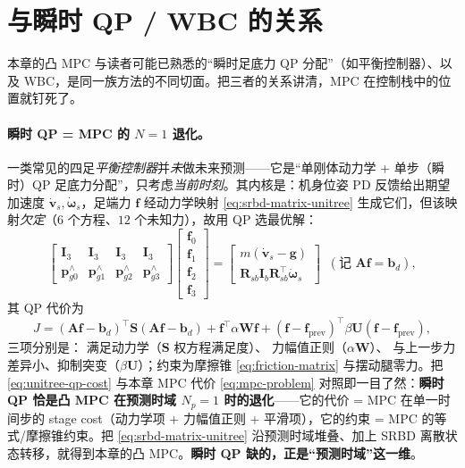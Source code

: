 \section{与瞬时 QP / WBC 的关系}
\label{sec:relation}

本章的凸 MPC 与读者可能已熟悉的“瞬时足底力 QP 分配”（如平衡控制器）、以及 WBC，是同一族方法的不同切面。把三者的关系讲清，MPC 在控制栈中的位置就钉死了。

\paragraph{瞬时 QP = MPC 的 $N=1$ 退化。}
一类常见的四足\emph{平衡控制器}并\emph{未}做未来预测——它是“单刚体动力学 + 单步（瞬时）QP 足底力分配”，只考虑\emph{当前时刻}\cite{unitree2023quadruped}。其内核是：机身位姿 PD 反馈给出期望加速度 $\dot{\boldsymbol{v}}_s,\dot{\boldsymbol{\omega}}_s$，足端力 $\mathbf{f}$ 经动力学映射 \cref{eq:srbd-matrix-unitree} 生成它们，但该映射\emph{欠定}（$6$ 个方程、$12$ 个未知力），故用 QP 选最优解：
\begin{equation}
  \begin{bmatrix}\mathbf{I}_3&\mathbf{I}_3&\mathbf{I}_3&\mathbf{I}_3\\ \boldsymbol{p}_{g0}^{\wedge}&\boldsymbol{p}_{g1}^{\wedge}&\boldsymbol{p}_{g2}^{\wedge}&\boldsymbol{p}_{g3}^{\wedge}\end{bmatrix}
  \begin{bmatrix}\mathbf{f}_{0}\\\mathbf{f}_{1}\\\mathbf{f}_{2}\\\mathbf{f}_{3}\end{bmatrix}
  =\begin{bmatrix}m(\dot{\boldsymbol{v}}_s-\boldsymbol{g})\\ \mathbf{R}_{sb}\mathbf{I}_b\mathbf{R}_{sb}^\top\dot{\boldsymbol{\omega}}_s\end{bmatrix}
  \;\;(\text{记 }\mathbf{A}\mathbf{f}=\mathbf{b}_d),
  \label{eq:srbd-matrix-unitree}
\end{equation}
其 QP 代价为\cite{unitree2023quadruped}
\begin{equation}
  J=(\mathbf{A}\mathbf{f}-\mathbf{b}_d)^\top\mathbf{S}(\mathbf{A}\mathbf{f}-\mathbf{b}_d)+\mathbf{f}^\top\alpha\mathbf{W}\mathbf{f}+(\mathbf{f}-\mathbf{f}_{\text{prev}})^\top\beta\mathbf{U}(\mathbf{f}-\mathbf{f}_{\text{prev}}),
  \label{eq:unitree-qp-cost}
\end{equation}
三项分别是： 满足动力学（$\mathbf{S}$ 权方程满足度）、 力幅值正则（$\alpha\mathbf{W}$）、 与上一步力差异小、抑制突变（$\beta\mathbf{U}$）；约束为摩擦锥 \cref{eq:friction-matrix} 与摆动腿零力。把 \cref{eq:unitree-qp-cost} 与本章 MPC 代价 \cref{eq:mpc-problem} 对照即一目了然：\textbf{瞬时 QP 恰是凸 MPC 在预测时域 $N_p=1$ 时的退化}——它的代价 = MPC 在单一时间步的 stage cost（动力学项 + 力幅值正则 + 平滑项），它的约束 = MPC 的等式/摩擦锥约束。把 \cref{eq:srbd-matrix-unitree} 沿预测时域堆叠、加上 SRBD 离散状态转移，就得到本章的凸 MPC。\textbf{瞬时 QP 缺的，正是“预测时域”这一维}\cite{unitree2023quadruped}。

